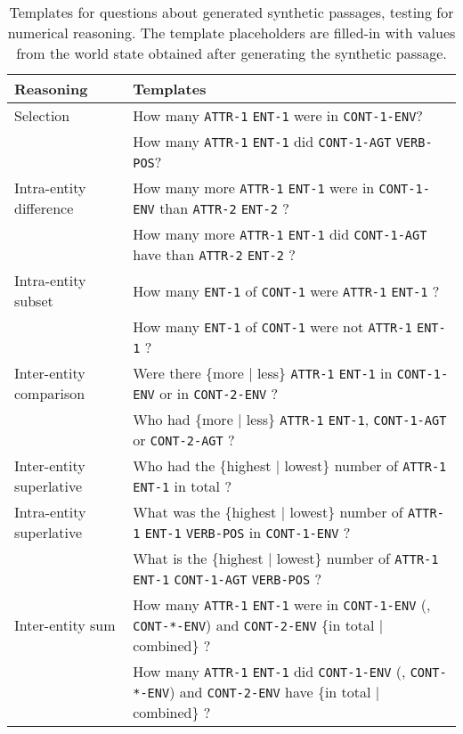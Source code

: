 \documentclass[11pt,a4paper]{article}
\begin{document}
\begin{table*}[t]
    \footnotesize
    \centering
    \begin{tabular}{lp{11.2cm}}
        \bf Reasoning & \bf Templates \\ 
        \toprule
        Selection & How many \texttt{ATTR-1} \texttt{ENT-1} were in \texttt{CONT-1-ENV}? \\
         & How many \texttt{ATTR-1} \texttt{ENT-1} did \texttt{CONT-1-AGT} \texttt{VERB-POS}? \\ \hline
        Intra-entity difference & How many more \texttt{ATTR-1} \texttt{ENT-1} were in \texttt{CONT-1-ENV} than \texttt{ATTR-2} \texttt{ENT-2} ? \\
         & How many more \texttt{ATTR-1} \texttt{ENT-1} did \texttt{CONT-1-AGT} have than \texttt{ATTR-2} \texttt{ENT-2} ? \\ \hline
        Intra-entity subset & How many \texttt{ENT-1} of \texttt{CONT-1} were \texttt{ATTR-1} \texttt{ENT-1} ? \\
         & How many \texttt{ENT-1} of \texttt{CONT-1} were not \texttt{ATTR-1} \texttt{ENT-1} ? \\ \hline
        Inter-entity comparison & Were there \{more | less\} \texttt{ATTR-1} \texttt{ENT-1} in \texttt{CONT-1-ENV} or in \texttt{CONT-2-ENV} ? \\
         & Who had \{more | less\} \texttt{ATTR-1} \texttt{ENT-1}, \texttt{CONT-1-AGT} or \texttt{CONT-2-AGT} ? \\ \hline
        Inter-entity superlative & Who had the \{highest | lowest\} number of \texttt{ATTR-1} \texttt{ENT-1} in total ?\\ \hline
        Intra-entity superlative & What was the \{highest | lowest\} number of \texttt{ATTR-1} \texttt{ENT-1} \texttt{VERB-POS} in \texttt{CONT-1-ENV} ?\\
         & What is the \{highest | lowest\} number of \texttt{ATTR-1} \texttt{ENT-1} \texttt{CONT-1-AGT} \texttt{VERB-POS} ?\\ \hline
         Inter-entity sum & How many \texttt{ATTR-1} \texttt{ENT-1} were in \texttt{CONT-1-ENV} (, \texttt{CONT-*-ENV}) and \texttt{CONT-2-ENV} \{in total | combined\} ?\\
          & How many \texttt{ATTR-1} \texttt{ENT-1} did \texttt{CONT-1-ENV} (, \texttt{CONT-*-ENV}) and \texttt{CONT-2-ENV} have \{in total | combined\} ?\\ \hline
    \end{tabular}
    \caption{Templates for questions about generated synthetic passages, testing for numerical reasoning. The template placeholders are filled-in with values from the world state obtained after generating the synthetic passage.}
    \label{table:synthetic_textual_questions}
\end{table*}
\end{document}
